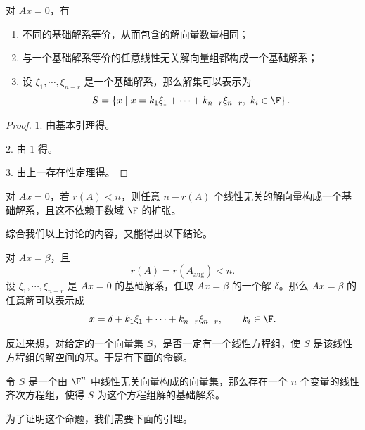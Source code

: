 \begin{proposition}
	对 $Ax=0$，有
	\begin{enumerate}
		\item 不同的基础解系等价，从而包含的解向量数量相同；
		\item 与一个基础解系等价的任意线性无关解向量组都构成一个基础解系；
		\item 设 $\xi_1,\cdots,\xi_{n-r}$ 是一个基础解系，那么解集可以表示为
		\[
		S=\left\{x\mid x=k_1\xi_1+\cdots+k_{n-r}\xi_{n-r},\ k_i\in\F\right\}.
		\]
	\end{enumerate}
\end{proposition}
\begin{proof}
	$1.$ 由基本引理得。
	
	$2.$ 由 $1$ 得。
	
	$3.$ 由上一存在性定理得。
\end{proof}

对 $Ax=0$，若 $r(A)<n$，则任意 $n-r(A)$ 个线性无关的解向量构成一个基础解系，且这不依赖于数域 $\F$ 的扩张。

综合我们以上讨论的内容，又能得出以下结论。

\begin{proposition}
	对 $Ax=\beta$，且
	\[
	r(A)=r(A_{\mathrm{aug}})<n.
	\]
	设 $\xi_1,\cdots,\xi_{n-r}$ 是 $Ax=0$ 的基础解系，任取 $Ax=\beta$ 的一个解 $\delta$。那么 $Ax=\beta$ 的任意解可以表示成
	\[
	x=\delta+k_1\xi_1+\cdots+k_{n-r}\xi_{n-r},
	\qquad k_i\in\F.
	\]
\end{proposition}

反过来想，对给定的一个向量集 $S$，是否一定有一个线性方程组，使 $S$ 是该线性方程组的解空间的基。于是有下面的命题。

\begin{proposition}
	令 $S$ 是一个由 $\F^n$ 中线性无关向量构成的向量集，那么存在一个 $n$ 个变量的线性齐次方程组，使得 $S$ 为这个方程组解的基础解系。
\end{proposition}

为了证明这个命题，我们需要下面的引理。

